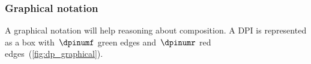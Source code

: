 \begin{example}

\end{example}

\FloatBarrier

\subsubsection{Graphical notation}

A graphical notation will help reasoning about composition.
A DPI is represented as a box with~$\dpinumf$ green edges and~$\dpinumr$ red edges~(\cref{fig:dp_graphical}).

